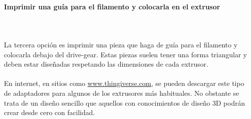 \documentclass[11pt,a4paper]{article}
\begin{document}
			\paragraph{Imprimir una guía para el filamento y colocarla en el extrusor}\mbox{}\\\\
La tercera opción es imprimir una pieza que haga de guía para el filamento y colocarla debajo del drive-gear. Estas piezas suelen tener una forma triangular y deben estar diseñadas respetando las dimensiones de cada extrusor.
\\\\
En internet, en sitios como \url{www.thingiverse.com}, se pueden descargar este tipo de adaptadores para algunos de los extrusores más habituales. No obstante se trata de un diseño sencillo que aquellos con conocimientos de diseño 3D podrán crear desde cero con facilidad.
\end{document}
